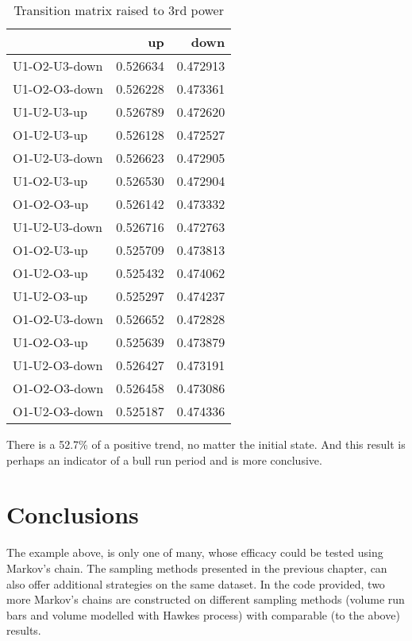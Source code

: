 \begin{table}[H]
\caption{Transition matrix raised to 3rd power}
\centering
\begin{tabular}{lrr}
\toprule
{} &        up &      down \\
\midrule
U1-O2-U3-down &  0.526634 &  0.472913 \\
U1-O2-O3-down &  0.526228 &  0.473361 \\
U1-U2-U3-up   &  0.526789 &  0.472620 \\
O1-U2-U3-up   &  0.526128 &  0.472527 \\
O1-U2-U3-down &  0.526623 &  0.472905 \\
U1-O2-U3-up   &  0.526530 &  0.472904 \\
O1-O2-O3-up   &  0.526142 &  0.473332 \\
U1-U2-U3-down &  0.526716 &  0.472763 \\
O1-O2-U3-up   &  0.525709 &  0.473813 \\
O1-U2-O3-up   &  0.525432 &  0.474062 \\
U1-U2-O3-up   &  0.525297 &  0.474237 \\
O1-O2-U3-down &  0.526652 &  0.472828 \\
U1-O2-O3-up   &  0.525639 &  0.473879 \\
U1-U2-O3-down &  0.526427 &  0.473191 \\
O1-O2-O3-down &  0.526458 &  0.473086 \\
O1-U2-O3-down &  0.525187 &  0.474336 \\
\bottomrule
\end{tabular}
\label{Tab: price_markov_3}
\end{table}

There is a 52.7\% of a positive trend, no matter the initial state. And this result is perhaps an indicator of a bull run period and is more conclusive.

\section{Conclusions}

The example above, is only one of many, whose efficacy could be tested using Markov's chain. The sampling methods presented in the previous chapter, can also offer additional strategies on the same dataset. In the code provided, two more Markov's chains are constructed on different sampling methods (volume run bars and volume modelled with Hawkes process) with comparable (to the above) results.


